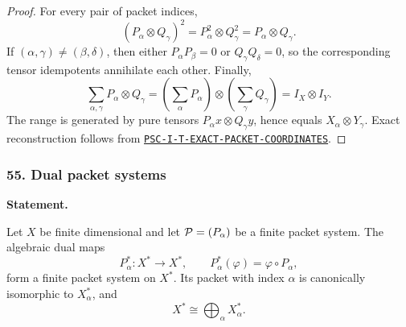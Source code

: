 \begin{proof}
For every pair of packet indices,
\[
(P_\alpha\otimes Q_\gamma)^2
=P_\alpha^2\otimes Q_\gamma^2
=P_\alpha\otimes Q_\gamma.
\]
If \((\alpha,\gamma)\neq(\beta,\delta)\), then either \(P_\alpha P_\beta=0\) or \(Q_\gamma Q_\delta=0\), so the corresponding tensor idempotents annihilate each other.  Finally,
\[
\sum_{\alpha,\gamma}P_\alpha\otimes Q_\gamma
=
\left(\sum_\alpha P_\alpha\right)
\otimes
\left(\sum_\gamma Q_\gamma\right)
=I_X\otimes I_Y.
\]
The range is generated by pure tensors \(P_\alpha x\otimes Q_\gamma y\), hence equals \(X_\alpha\otimes Y_\gamma\).  Exact reconstruction follows from \hyperref[rec:PSC-I-T-EXACT-PACKET-COORDINATES]{\nolinkurl{PSC-I-T-EXACT-PACKET-COORDINATES}}.
\end{proof}
\subsubsection*{55. Dual packet systems}
\label{rec:PSC-I-P-DUAL-PACKET-SYSTEM}
\textbf{Statement.}\par
Let \(X\) be finite dimensional and let \(\mathcal P=(P_\alpha)\) be a finite packet system.  The algebraic dual maps
\[
P_\alpha^*:X^*\to X^*,
\qquad
P_\alpha^*(\varphi)=\varphi\circ P_\alpha,
\]
form a finite packet system on \(X^*\).  Its packet with index \(\alpha\) is canonically isomorphic to \(X_\alpha^*\), and
\[
X^*\cong\bigoplus_\alpha X_\alpha^*.
\]

